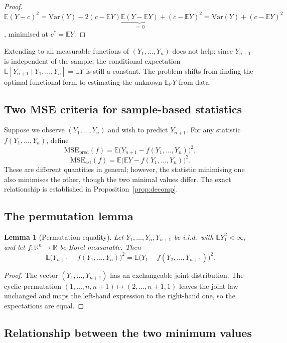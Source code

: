 \documentclass[a4paper,oneside,12pt]{extarticle}
\theoremstyle{plain}
\newtheorem{lemma}[proposition]{Lemma}
\theoremstyle{definition}
\theoremstyle{remark}
\newcommand*{\E}{\mathbb{E}}
\newcommand*{\mbR}{\mathbb{R}}
\newcommand*{\mP}{\mathbb{P}}
\begin{document}
\begin{proof}
$\E(Y-c)^2
= \mathrm{Var}(Y)
  - 2(c-\E Y)\underbrace{\E(Y-\E Y)}_{=\,0}
  + (c-\E Y)^2
= \mathrm{Var}(Y) + (c-\E Y)^2$,
minimised at $c^* = \E Y$.
\end{proof}

Extending to all measurable functions of $(Y_1,\ldots,Y_n)$ does not help:
since $Y_{n+1}$ is independent of the sample, the conditional expectation
$\E[Y_{n+1} \mid Y_1,\ldots,Y_n] = \E Y$ is still a constant. The
problem shifts from finding the optimal functional form to estimating
the unknown $\E_\mP Y$ from data.

\subsection{Two MSE criteria for sample-based statistics}

Suppose we observe $(Y_1,\ldots,Y_n)$ and wish to predict $Y_{n+1}$.
For any statistic $f(Y_1,\ldots,Y_n)$, define
\[
\mathrm{MSE}_{\mathrm{pred}}(f)
= \E\bigl(Y_{n+1} - f(Y_1,\ldots,Y_n)\bigr)^2,
\]
\[
\mathrm{MSE}_{\mathrm{est}}(f)
= \E\bigl(\E Y - f(Y_1,\ldots,Y_n)\bigr)^2.
\]
These are different quantities in general; however, the statistic
minimising one also minimises the other, though the two minimal values
differ. The exact relationship is established in
Proposition~\ref{prop:decomp}.

\subsection{The permutation lemma}

\begin{lemma}[Permutation equality]
\label{lem:permutation}
Let $Y_1,\ldots,Y_n,Y_{n+1}$ be i.i.d.\ with $\E Y_1^2 < \infty$, and
let $f:\mbR^n\to\mbR$ be Borel-measurable. Then
\[
\E\bigl(Y_{n+1} - f(Y_1,\ldots,Y_n)\bigr)^2
= \E\bigl(Y_1 - f(Y_2,\ldots,Y_{n+1})\bigr)^2.
\]
\end{lemma}

\begin{proof}
The vector $(Y_1,\ldots,Y_{n+1})$ has an exchangeable joint distribution.
The cyclic permutation $(1,\ldots,n,n{+}1) \mapsto (2,\ldots,n{+}1,1)$
leaves the joint law unchanged and maps the left-hand expression to the
right-hand one, so the expectations are equal.
\end{proof}

\subsection{Relationship between the two minimum values}
\end{document}
